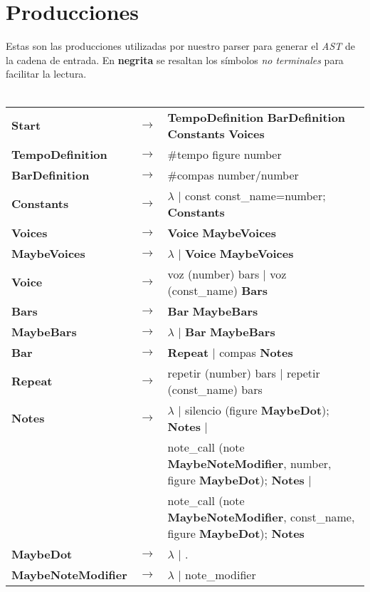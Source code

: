 \section{Producciones}
Estas son las producciones utilizadas por nuestro parser para generar el \textit{AST} de la cadena de entrada. En \textbf{negrita} se resaltan los símbolos \textit{no terminales} para facilitar la lectura. \\
\\
\begin{tabular}{l l l}
	\textbf{Start} & $\rightarrow$ & \textbf{TempoDefinition} \textbf{BarDefinition} \textbf{Constants} \textbf{Voices} \\
	\textbf{TempoDefinition} & $\rightarrow$ & \#tempo figure number \\
	\textbf{BarDefinition} & $\rightarrow$ & \#compas number/number \\
	\textbf{Constants} & $\rightarrow$ & $\lambda$ $\vert$ const const\_name=number; \textbf{Constants} \\
	\textbf{Voices} & $\rightarrow$ & \textbf{Voice} \textbf{MaybeVoices} \\
	\textbf{MaybeVoices} & $\rightarrow$ & $\lambda$ $\vert$ \textbf{Voice} \textbf{MaybeVoices} \\
	\textbf{Voice} & $\rightarrow$ & voz (number) { bars } $\vert$ voz (const\_name) { \textbf{Bars} } \\
	\textbf{Bars} & $\rightarrow$ & \textbf{Bar} \textbf{MaybeBars} \\
	\textbf{MaybeBars} & $\rightarrow$ & $\lambda$ $\vert$ \textbf{Bar} \textbf{MaybeBars} \\
	\textbf{Bar} & $\rightarrow$ & \textbf{Repeat} $\vert$ compas { \textbf{Notes} } \\
	\textbf{Repeat} & $\rightarrow$ & repetir (number) { bars } $\vert$ repetir (const\_name) { bars } \\
	\textbf{Notes} & $\rightarrow$ & $\lambda$ $\vert$ silencio (figure \textbf{MaybeDot}); \textbf{Notes} $\vert$ \\
	& & note\_call (note \textbf{MaybeNoteModifier}, number, figure \textbf{MaybeDot}); \textbf{Notes} $\vert$ \\
	& & note\_call (note \textbf{MaybeNoteModifier}, const\_name, figure \textbf{MaybeDot}); \textbf{Notes} \\
	\textbf{MaybeDot} & $\rightarrow$ & $\lambda$ $\vert$ . \\
	\textbf{MaybeNoteModifier} & $\rightarrow$ & $\lambda$ $\vert$ note\_modifier \\
\end{tabular}

